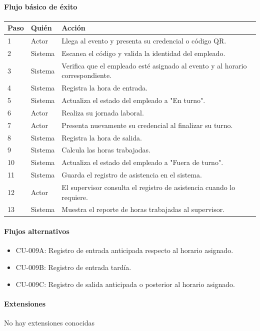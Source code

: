 \paragraph{Flujo básico de éxito}
\begin{longtable}{P{1.1cm}P{1.8cm}P{10.5cm}}
\toprule
\textbf{Paso} & \textbf{Quién} & \textbf{Acción}\\
\midrule
{} & Actor & Llega al evento y presenta su credencial o código QR.\\
2 & Sistema & Escanea el código y valida la identidad del empleado.\\
3 & Sistema & Verifica que el empleado esté asignado al evento y al horario correspondiente.\\
4 & Sistema & Registra la hora de entrada.\\
5 & Sistema & Actualiza el estado del empleado a "En turno".\\
6 & Actor & Realiza su jornada laboral.\\
7 & Actor & Presenta nuevamente su credencial al finalizar su turno.\\
8 & Sistema & Registra la hora de salida.\\
9 & Sistema & Calcula las horas trabajadas.\\
10 & Sistema & Actualiza el estado del empleado a "Fuera de turno".\\
11 & Sistema & Guarda el registro de asistencia en el sistema.\\
12 & Actor & El supervisor consulta el registro de asistencia cuando lo requiere.\\
13 & Sistema & Muestra el reporte de horas trabajadas al supervisor.\\
\bottomrule
\end{longtable}

\paragraph{Flujos alternativos}
\begin{itemize}[leftmargin=1.4em, topsep=1pt]
  \item CU-009A: Registro de entrada anticipada respecto al horario asignado.
  \item CU-009B: Registro de entrada tardía.
  \item CU-009C: Registro de salida anticipada o posterior al horario asignado.
\end{itemize}

\paragraph{Extensiones}
No hay extensiones conocidas

